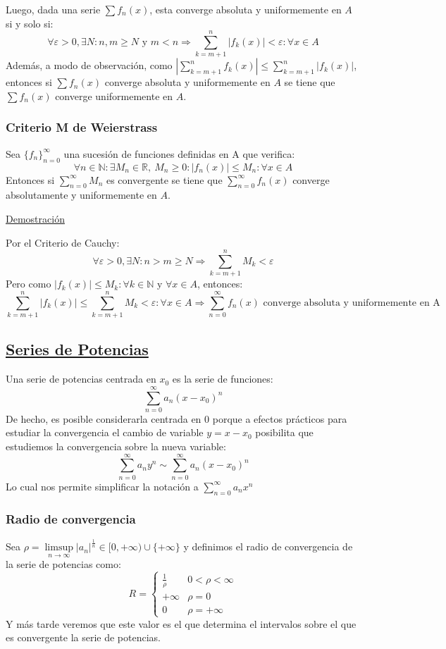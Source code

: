 \documentclass[10pt,a4paper,openright]{book}
\begin{document}
Luego, dada una serie $\sum f_n (x)$, esta converge absoluta y uniformemente en $A$ si y solo si:
$$\forall \varepsilon > 0, \exists N : n,m \geq N \mbox{ y } m < n \Rightarrow \sum_{k=m + 1}^{n} |f_k (x)| < \varepsilon : \forall x \in A$$
Además, a modo de observación, como $ |\sum_{k=m + 1}^{n} f_k (x)| \leq \sum_{k=m + 1}^{n} |f_k (x)| $, entonces si $\sum f_n (x)$ converge absoluta y uniformemente en $A$ se tiene que $\sum f_n (x)$ converge uniformemente en $A$.

\subsubsection*{Criterio M de Weierstrass}
Sea $\{f_n\}_{n = 0}^\infty$ una sucesión de funciones definidas en A que verifica:
$$\forall n \in \mathbb{N}: \exists M_n \in \mathbb{R},\  M_n \geq 0: |f_n (x)| \leq M_n : \forall x \in A$$
Entonces si $\sum_{n= 0}^{\infty} M_n$ es convergente se tiene que $\sum_{n = 0}^{\infty} f_n(x)$ converge absolutamente y uniformemente en $A$.

\underline{Demostración}

Por el Criterio de Cauchy:
$$\forall \varepsilon >0, \exists N : n > m \geq N \Rightarrow \sum_{k=m+1}^{n} M_k < \varepsilon$$
Pero como $|f_k (x)| \leq M_k : \forall k \in \mathbb{N} \mbox{ y } \forall x \in A$, entonces:
$$\sum_{k=m+1}^{n} |f_k (x)| \leq \sum_{k=m+1}^{n} M_k < \varepsilon : \forall x \in A \Rightarrow \sum_{n=0}^{\infty} f_n (x) \mbox{ converge absoluta y uniformemente en A}$$

\subsection*{\underline{Series de Potencias}}
Una serie de potencias centrada en $x_0$ es la serie de funciones:
$$\sum_{n=0}^{\infty} a_n (x - x_0)^n$$
De hecho, es posible considerarla centrada en $0$ porque a efectos prácticos para estudiar la convergencia el cambio de variable $y = x - x_0$ posibilita que estudiemos la convergencia sobre la nueva variable:
$$\sum_{n = 0}^{\infty} a_n y^n \sim \sum_{n=0}^{\infty} a_n (x - x_0)^n$$
Lo cual nos permite simplificar la notación a $\sum_{n=0}^{\infty} a_n x^n$

\subsubsection*{Radio de convergencia}
Sea $\rho =  \underset{n \to \infty}\limsup |a_n|^{\frac{1}{n}} \in [0, +\infty) \cup \{+ \infty\}$ y definimos el radio de convergencia de la serie de potencias como:
$$R = \begin{cases} \frac{1}{\rho}  & 0 < \rho < \infty \\ +\infty   & \rho = 0 \\ 0   & \rho = +\infty \end{cases}$$
Y más tarde veremos que este valor es el que determina el intervalos sobre el que es convergente la serie de potencias.
\end{document}
